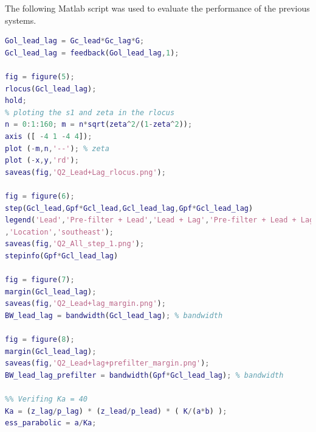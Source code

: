 \documentclass[11pt, a4paper]{article}
\begin{document}
\begin{table}[!ht]
	\centering
	\caption{Performance evaluation to unit step response}
	\label{tab:Q2_all}
\end{table}

The following Matlab script was used to evaluate the performance of the previous systems.
\begin{lstlisting}[language=matlab, caption={}, label={}]
%% Evaluating the performance with the phase-lead, phase-lag and prefilter
Gol_lead_lag = Gc_lead*Gc_lag*G;
Gcl_lead_lag = feedback(Gol_lead_lag,1);

fig = figure(5); 
rlocus(Gcl_lead_lag);
hold;
% ploting the s1 and zeta in the rlocus
n = 0:1:160; m = n*sqrt(zeta^2/(1-zeta^2));
axis ([ -4 1 -4 4]);
plot (-m,n,'--'); % zeta
plot (-x,y,'rd');
saveas(fig,'Q2_Lead+Lag_rlocus.png');

fig = figure(6);
step(Gcl_lead,Gpf*Gcl_lead,Gcl_lead_lag,Gpf*Gcl_lead_lag)
legend('Lead','Pre-filter + Lead','Lead + Lag','Pre-filter + Lead + Lag'...
,'Location','southeast');
saveas(fig,'Q2_All_step_1.png');
stepinfo(Gpf*Gcl_lead_lag)

fig = figure(7);
margin(Gcl_lead_lag);
saveas(fig,'Q2_Lead+lag_margin.png');
BW_lead_lag = bandwidth(Gcl_lead_lag); % bandwidth

fig = figure(8);
margin(Gcl_lead_lag);
saveas(fig,'Q2_Lead+lag+prefilter_margin.png');
BW_lead_lag_prefilter = bandwidth(Gpf*Gcl_lead_lag); % bandwidth

%% Verifing Ka = 40
Ka = (z_lag/p_lag) * (z_lead/p_lead) * ( K/(a*b) );
ess_parabolic = a/Ka; 
\end{lstlisting}
\end{document}
